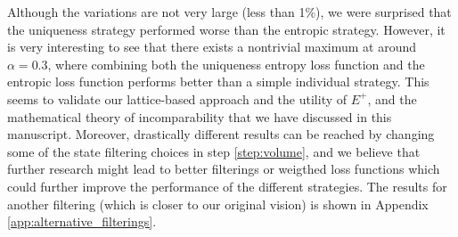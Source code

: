 Although the variations are not very large (less than 1\%), we were surprised that the uniqueness strategy performed worse than the entropic strategy. However, it is very interesting to see that there exists a nontrivial maximum at around $\alpha = 0.3$, where combining both the uniqueness entropy loss function and the entropic loss function performs better than a simple individual strategy. This seems to validate our lattice-based approach and the utility of $E^+$, and the mathematical theory of incomparability that we have discussed in this manuscript. Moreover, drastically different results can be reached by changing some of the state filtering choices in step \ref{step:volume}, and we believe that further research might lead to better filterings or weigthed loss functions which could further improve the performance of the different strategies. The results for another filtering (which is closer to our original vision) is shown in Appendix \ref{app:alternative_filterings}.
